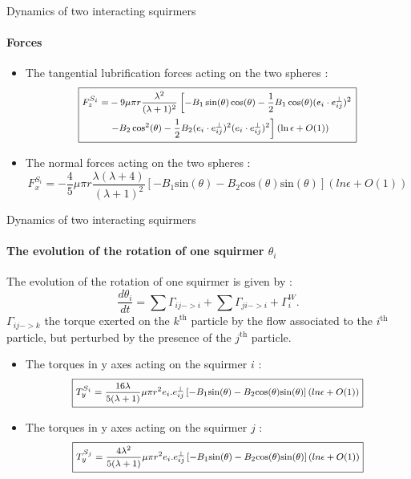 \documentclass{beamer}
\begin{document}
    \begin{frame}{Dynamics of two interacting squirmers}
        \framesubtitle{Forces}
        \begin{itemize}
            \item The tangential lubrification forces acting on the two spheres : \begin{equation*}
    \footnotesize
    \boxed{
        \begin{aligned}
        F_z^{S_i} = & -9 \mu \pi r \frac{\lambda ^2}{(\lambda +1)^2} \left[ -B_1 \sin(\theta)\cos(\theta) - \frac{1}{2} B_1  \cos(\theta) (e_i \cdot e^{\perp}_{ij})^2 \right. \\
        & \left. -B_2 \cos^2(\theta) - \frac{1}{2} B_2 (e_i \cdot e^{\perp}_{ij})^2 (e_i \cdot e^{\perp}_{ij})^2 \right] (\ln \epsilon + O(1))
        \end{aligned}
    }
    \end{equation*}
        \item The normal forces acting on the two spheres :
        \begin{equation*}
        \boxed{F_x^{S_i} = -\frac{4}{5} \mu \pi r \frac{\lambda(\lambda +4)}{(\lambda +1)^2} \left[ -B_1\mathrm{sin}(\theta) -B_2\mathrm{cos}(\theta)\mathrm{sin}(\theta)\right] (ln \epsilon + O(1))}
    \end{equation*}
        \end{itemize}
    
    \end{frame}
    
    \begin{frame}{Dynamics of two interacting squirmers}
        \framesubtitle{The evolution of the rotation of one squirmer $\theta _i$}
    The evolution of the rotation of one squirmer is given by : 
    $$
    \frac{d \theta_i}{dt} = \sum \Gamma_{ij->i} + \sum \Gamma_{ji->i} +  \Gamma_{i}^W.
    $$ 
    $\Gamma_{ij->k}$ the torque exerted on the $k^\mathrm{th}$ particle by the flow associated to the $i^\mathrm{th}$ particle, but perturbed by the presence of the $j^\mathrm{th}$ particle.
    
    \begin{itemize}
        \item The torques in y axes acting on the squirmer $i$ :
        \begin{equation*}
        \footnotesize
        \boxed{T_y^{S_i} = \frac{16 \lambda}{5(\lambda +1)} \mu \pi r^2 e_i.e^{\perp}_{ij}\left[-B_1\mathrm{sin}(\theta) -B_2\mathrm{cos}(\theta)\mathrm{sin}(\theta) \right] (ln \epsilon + O(1))}
    \end{equation*}
        \item The torques in y axes acting on the squirmer $j$ :
        \begin{equation*}
        \footnotesize
        \boxed{T_y^{S_j} = \frac{4 \lambda^2}{5(\lambda +1)} \mu \pi r^2 e_i.e^{\perp}_{ij}\left[-B_1\mathrm{sin}(\theta) -B_2\mathrm{cos}(\theta)\mathrm{sin}(\theta) \right] (ln \epsilon + O(1))}
    \end{equation*}
    \end{itemize}
        
    \end{frame}
\end{document}
